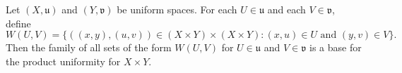 \begin{definition}
Let $(X, \mathfrak{u})$ and $(Y, \mathfrak{v})$ be uniform spaces. For each $U \in \mathfrak{u}$ and each $V \in \mathfrak{v}$, define
\[
W(U, V) = \{((x, y), (u, v)) \in (X \times Y) \times (X \times Y) : (x, u) \in U \text{ and } (y, v) \in V\}.
\]
Then the family of all sets of the form $W(U, V)$ for $U \in \mathfrak{u}$ and $V \in \mathfrak{v}$ is a base for the product uniformity for $X \times Y$.
\end{definition}
